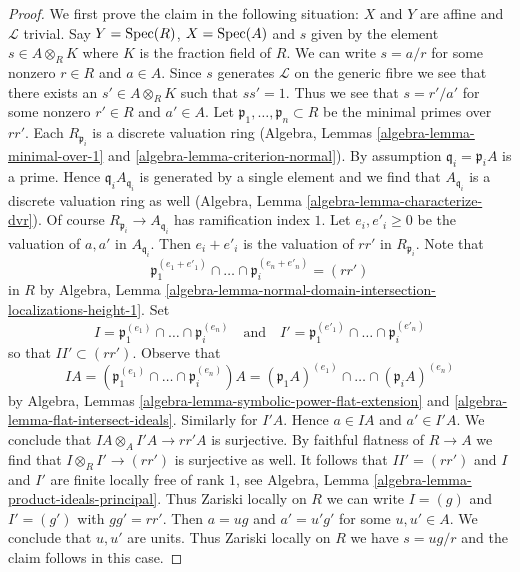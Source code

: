 \begin{proof}
\medskip\noindent
We first prove the claim in the following situation:
$X$ and $Y$ are affine and $\mathcal{L}$ trivial. Say $Y = \mathop{\mathrm{Spec}}(R)$,
$X = \mathop{\mathrm{Spec}}(A)$ and $s$ given by the element $s \in A \otimes_R K$
where $K$ is the fraction field of $R$. We can write $s = a/r$
for some nonzero $r \in R$ and $a \in A$. Since $s$ generates $\mathcal{L}$
on the generic fibre we see that there exists an $s' \in A \otimes_R K$
such that $ss' = 1$. Thus we see that $s = r'/a'$ for some
nonzero $r' \in R$ and $a' \in A$. Let
$\mathfrak p_1, \ldots, \mathfrak p_n \subset R$
be the minimal primes over $rr'$. Each $R_{\mathfrak p_i}$
is a discrete valuation ring
(Algebra, Lemmas \ref{algebra-lemma-minimal-over-1} and
\ref{algebra-lemma-criterion-normal}). By assumption
$\mathfrak q_i = \mathfrak p_i A$ is a prime. Hence
$\mathfrak q_i A_{\mathfrak q_i}$ is generated by a single element
and we find that $A_{\mathfrak q_i}$ is a discrete valuation ring as
well (Algebra, Lemma \ref{algebra-lemma-characterize-dvr}). Of course
$R_{\mathfrak p_i} \to A_{\mathfrak q_i}$ has ramification index $1$.
Let $e_i, e'_i \geq 0$ be the  valuation of $a, a'$ in $A_{\mathfrak q_i}$.
Then $e_i + e'_i$ is the valuation of $rr'$ in $R_{\mathfrak p_i}$. Note that
$$
\mathfrak p_1^{(e_1 + e'_1)} \cap \ldots \cap \mathfrak p_i^{(e_n + e'_n)} =
(rr')
$$
in $R$ by Algebra, Lemma
\ref{algebra-lemma-normal-domain-intersection-localizations-height-1}.
Set
$$
I = \mathfrak p_1^{(e_1)} \cap \ldots \cap \mathfrak p_i^{(e_n)}
\quad\text{and}\quad
I' = \mathfrak p_1^{(e'_1)} \cap \ldots \cap \mathfrak p_i^{(e'_n)}
$$
so that $II' \subset (rr')$. Observe that
$$
IA =
(\mathfrak p_1^{(e_1)} \cap \ldots \cap \mathfrak p_i^{(e_n)})A =
(\mathfrak p_1A)^{(e_1)} \cap \ldots \cap (\mathfrak p_i A)^{(e_n)}
$$
by Algebra, Lemmas \ref{algebra-lemma-symbolic-power-flat-extension} and
\ref{algebra-lemma-flat-intersect-ideals}. Similarly for $I'A$. Hence
$a \in IA$ and $a' \in I'A$.
We conclude that $IA \otimes_A I'A \to rr'A$ is surjective.
By faithful flatness of $R \to A$ we find that
$I \otimes_R I' \to (rr')$ is surjective as well.
It follows that $II' = (rr')$ and $I$ and $I'$ are finite locally
free of rank $1$, see
Algebra, Lemma \ref{algebra-lemma-product-ideals-principal}.
Thus Zariski locally on $R$ we can write $I = (g)$ and $I' = (g')$
with $gg' = rr'$. Then $a = ug$ and $a' = u'g'$ for some $u, u' \in A$.
We conclude that $u, u'$ are units. Thus Zariski locally on $R$
we have $s = ug/r$ and the claim follows in this case.


\end{proof}
